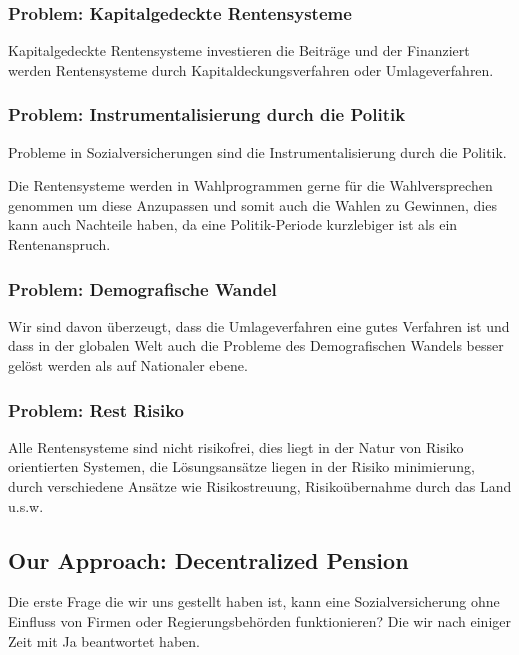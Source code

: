 \subsubsection*{Problem: Kapitalgedeckte Rentensysteme}

Kapitalgedeckte Rentensysteme investieren die Beiträge und der Finanziert werden Rentensysteme durch Kapitaldeckungsverfahren oder Umlageverfahren.


\subsubsection*{Problem: Instrumentalisierung durch die Politik}

Probleme in Sozialversicherungen sind die Instrumentalisierung durch die Politik.

Die Rentensysteme werden in Wahlprogrammen gerne für die Wahlversprechen genommen um diese Anzupassen und somit auch die Wahlen zu Gewinnen, dies kann auch Nachteile haben, da eine Politik-Periode kurzlebiger ist als ein Rentenanspruch.

\subsubsection*{Problem: Demografische Wandel}

Wir sind davon überzeugt, dass die Umlageverfahren eine gutes Verfahren ist und dass in der globalen Welt auch die Probleme des Demografischen Wandels besser gelöst werden als auf Nationaler ebene. 

\subsubsection*{Problem: Rest Risiko}

Alle Rentensysteme sind nicht risikofrei, dies liegt in der Natur von Risiko orientierten Systemen, die Lösungsansätze liegen in der Risiko minimierung, durch verschiedene Ansätze wie Risikostreuung, Risikoübernahme durch das Land u.s.w.


\subsection{Our Approach: Decentralized Pension}

Die erste Frage die wir uns gestellt haben ist, kann eine Sozialversicherung ohne Einfluss von Firmen oder Regierungsbehörden funktionieren? Die wir nach einiger Zeit mit Ja beantwortet haben.

